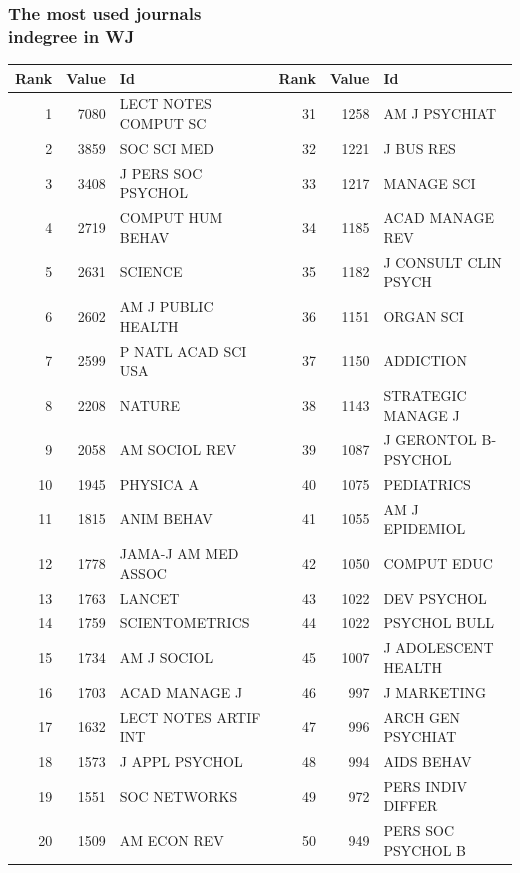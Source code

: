 \documentclass[hyperref={pdfstartview={FitBH -32768},
                         pdfpagemode=FullScreen,
                         plainpages=false,
                         colorlinks=true}
              ]{beamer}
\begin{document}
\begin{frame}[fragile]
\frametitle{The most used journals \\ \normalsize indegree in WJ}

\renewcommand{\arraystretch}{0.82}
\tiny
\begin{tabular}{r|r|l||r|r|l}
Rank&   	Value&   	Id&   	Rank&   	Value&   	Id \\ \hline
1&   	7080&   	LECT NOTES COMPUT SC&   	31&   	1258&   	AM J PSYCHIAT\\   
2&   	3859&   	SOC SCI MED&   	32&   	1221&   	J BUS RES\\   
3&   	3408&   	J PERS SOC PSYCHOL&   	33&   	1217&   	MANAGE SCI\\   
4&   	2719&   	COMPUT HUM BEHAV&   	34&   	1185&   	ACAD MANAGE REV\\   
5&   	2631&   	SCIENCE&   	35&   	1182&   	J CONSULT CLIN PSYCH\\   
6&   	2602&   	AM J PUBLIC HEALTH&   	36&   	1151&   	ORGAN SCI\\   
7&   	2599&   	P NATL ACAD SCI USA&   	37&   	1150&   	ADDICTION\\   
8&   	2208&   	NATURE&   	38&   	1143&   	STRATEGIC MANAGE J\\   
9&   	2058&   	AM SOCIOL REV&   	39&   	1087&   	J GERONTOL B-PSYCHOL\\   
10&   	1945&   	PHYSICA A&   	40&   	1075&   	PEDIATRICS\\   
11&   	1815&   	ANIM BEHAV&   	41&   	1055&   	AM J EPIDEMIOL\\   
12&   	1778&   	JAMA-J AM MED ASSOC&   	42&   	1050&   	COMPUT EDUC\\   
13&   	1763&   	LANCET&   	43&   	1022&   	DEV PSYCHOL\\   
14&   	1759&   	SCIENTOMETRICS&   	44&   	1022&   	PSYCHOL BULL\\   
15&   	1734&   	AM J SOCIOL&   	45&   	1007&   	J ADOLESCENT HEALTH\\   
16&   	1703&   	ACAD MANAGE J&   	46&   	997&   	J MARKETING\\   
17&   	1632&   	LECT NOTES ARTIF INT&   	47&   	996&   	ARCH GEN PSYCHIAT\\   
18&   	1573&   	J APPL PSYCHOL&   	48&   	994&   	AIDS BEHAV\\   
19&   	1551&   	SOC NETWORKS&   	49&   	972&   	PERS INDIV DIFFER\\   
20&   	1509&   	AM ECON REV&   	50&   	949&   	PERS SOC PSYCHOL B\\   

\end{tabular}
\end{frame}
\end{document}
